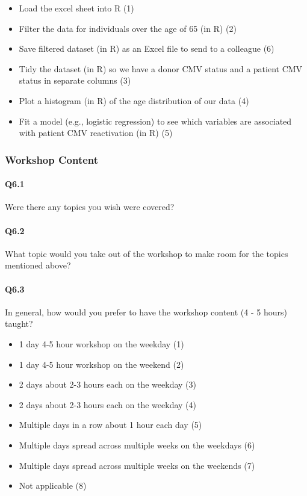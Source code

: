 \documentclass[030-workshop.tex]{subfiles}
\begin{document}
    \begin{itemize}
        \item Load the excel sheet into R (1)
        \item Filter the data for individuals over the age of 65 (in R) (2)
        \item Save filtered dataset (in R) as an Excel file to send to a colleague (6)
        \item Tidy the dataset (in R) so we have a donor CMV status and a patient CMV status in separate columns (3)
        \item Plot a histogram (in R) of the age distribution of our data (4)
        \item Fit a model (e.g., logistic regression) to see which variables are associated with patient CMV reactivation  (in R) (5)
    \end{itemize}

\subsubsection{Workshop Content}

    \paragraph{Q6.1}

        Were there any topics you wish were covered?

    \paragraph{Q6.2}

        What topic would you take out of the workshop to make room for the topics mentioned above?

    \paragraph{Q6.3}

        In general, how would you prefer to have the workshop content (4 - 5 hours) taught?

    \begin{itemize}
        \item 1 day 4-5 hour workshop on the weekday  (1)
        \item 1 day 4-5 hour workshop on the weekend  (2)
        \item 2 days about 2-3 hours each on the weekday  (3)
        \item 2 days about 2-3 hours each on the weekday  (4)
        \item Multiple days in a row about 1 hour each day  (5)
        \item Multiple days spread across multiple weeks on the weekdays  (6)
        \item Multiple days spread across multiple weeks on the weekends  (7)
        \item Not applicable  (8)
    \end{itemize}
\end{document}
